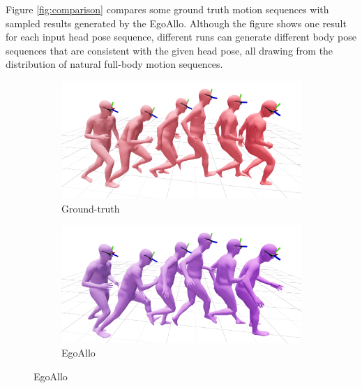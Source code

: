 \documentclass[../../book-main.tex]{subfiles}
\begin{document}
Figure \ref{fig:comparison} compares some ground truth motion sequences with sampled results generated by the EgoAllo. Although the figure shows one result for each input head pose sequence, different runs can generate different body pose sequences that are consistent with the given head pose, all drawing from the distribution of natural full-body motion sequences.
\begin{figure}[t]
\centering
\begin{subfigure}{0.45\textwidth}
  \centering
  \includegraphics[width=\linewidth]{figs_chap6/qual0_gt.png}
  \caption{\centering Ground-truth}
\end{subfigure}
\hfill
\begin{subfigure}{0.45\textwidth}
  \centering
  \includegraphics[width=\linewidth]{figs_chap6/qual0_ours.png}
  \caption{EgoAllo}
\end{subfigure}


\end{figure}
\end{document}
